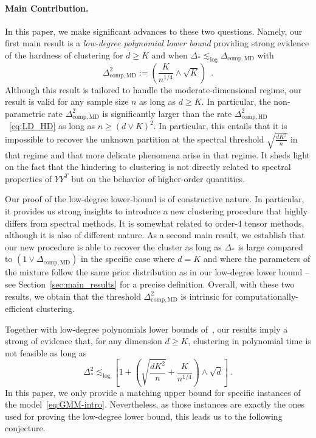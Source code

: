 \documentclass{article}
\begin{document}
\paragraph{Main Contribution.} In this paper, we make significant advances to these two questions. Namely, our first main result is a \emph{low-degree polynomial lower bound} providing  strong evidence of the hardness of clustering for $d\geq K$ and when $\Delta_*\lesssim_{\log} \Delta_{\mathrm{comp, MD}}$ with
\begin{equation}\label{eq:comp;MD}
\Delta_{\mathrm{comp, MD}}^2 := \left(\frac{K}{n^{1/4}} \land \sqrt{K}\right) \enspace .
\end{equation}
Although this result is tailored to handle the moderate-dimensional regime, our result is valid for any sample size $n$ as long as $d\geq K$. In particular, the non-parametric rate $\Delta_{\mathrm{comp, MD}}^2$ is significantly larger than the rate $\Delta_{\mathrm{comp, HD}}^2$~\eqref{eq:LD_HD} as long as $n\geq (d\vee K)^2$. In particular, this entails that it is impossible to recover the unknown partition at the spectral threshold $\sqrt{\frac{dK^2}{n}}$ in that regime and that more delicate phenomena arise in that regime. It sheds light on the fact that the hindering to clustering is not directly related to spectral properties of $YY^{T}$ but on the behavior of higher-order quantities. 




\medskip 

Our proof of the low-degree lower-bound is of constructive nature. In particular, it provides us strong insights to introduce a new clustering procedure that highly differs from spectral methods. It is somewhat related to order-4 tensor methods, although it is also of different nature. As a second main result, we establish that our new procedure is able to recover the cluster as long as $\Delta_*$ is large compared to $(1\vee \Delta_{\mathrm{comp, MD}})$ in the specific case where $d=K$ and where the parameters of the mixture follow the same prior distribution as in our low-degree lower bound --see Section~\ref{sec:main_results} for a precise definition. Overall, with these two results, we obtain that the threshold $\Delta_{\mathrm{comp, MD}}^2$ is intrinsic for computationally-efficient clustering. 






\medskip 




Together with low-degree polynomials lower bounds of~\cite{Even25}, our results imply a strong of evidence that, for any dimension $d\geq K$, clustering in polynomial time is not feasible as long as 
\begin{equation}\label{eq:LD_general:lower_bound}
\Delta_*^2 \lesssim_{\log}  \left[1 + \left( \sqrt{\frac{dK^2}{n}}+  \frac{K}{n^{1/4}} \right)  \wedge \sqrt{d} \right]\ .
\end{equation}
In this paper, we only provide a matching upper bound for specific instances of the model~\eqref{eq:GMM-intro}. Nevertheless, as those instances are exactly the ones used for proving the low-degree lower bound, this leads us to the following conjecture.
\end{document}
